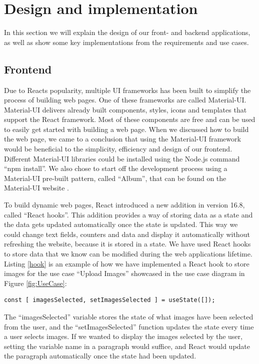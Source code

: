 

\section{Design and implementation}
In this section we will explain the design of our front- and backend applications, as well as show some key implementations from the requirements and use cases.  
%
\subsection{Frontend}
Due to Reacts popularity, multiple UI frameworks has been built to simplify the process of building web pages. One of these frameworks are called Material-UI. Material-UI delivers already built components, styles, icons and templates that support the React framework. Most of these components are free and can be used to easily get started with building a web page. When we discussed how to build the web page, we came to a conclusion that using the Material-UI framework would be beneficial to the simplicity, efficiency and design of our frontend. Different Material-UI libraries could be installed using the Node.js command ``npm install''. We also chose to start off the development process using a Material-UI pre-built pattern, called ``Album'', that can be found on the Material-UI website \cite{MaterialUI}. 

To build dynamic web pages, React introduced a new addition in version 16.8, called ``React hooks''. This addition provides a way of storing data as a state and the data gets updated automatically once the state is updated. This way we could change text fields, counters and data and display it automatically without refreshing the website, because it is stored in a state. We have used React hooks to store data that we know can be modified during the web applications lifetime. Listing \ref{hook} is an example of how we have implemented a React hook to store images for the use case ``Upload Images'' showcased in the use case diagram in Figure \ref{fig:UseCase}:
\begin{lstlisting}[style={htmlcssjs},caption={React hook implementation},label={hook}]
const [ imagesSelected, setImagesSelected ] = useState([]);
\end{lstlisting}
%
The ``imagesSelected'' variable stores the state of what images have been selected from the user, and the ``setImagesSelected'' function updates the state every time a user selects images. If we wanted to display the images selected by the user, setting the variable name in a paragraph would suffice, and React would update the paragraph automatically once the state had been updated.


